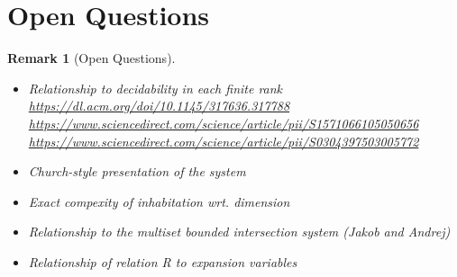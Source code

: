 \documentclass[10pt,a4paper]{article}
\theoremstyle{plain}%
\newtheorem{remark}[theorem]{Remark}
\begin{document}
\section*{Open Questions}
\begin{remark}[Open Questions]
\begin{itemize}
\item Relationship to decidability in each finite rank\\
\url{https://dl.acm.org/doi/10.1145/317636.317788}\\
\url{https://www.sciencedirect.com/science/article/pii/S1571066105050656}\\
\url{https://www.sciencedirect.com/science/article/pii/S0304397503005772}
\item Church-style presentation of the system
\item Exact compexity of inhabitation wrt. dimension
\item Relationship to the multiset bounded intersection system (Jakob and Andrej)
\item Relationship of relation R to expansion variables
\end{itemize}
\end{remark}


\newpage

\printbibliography
\end{document}
